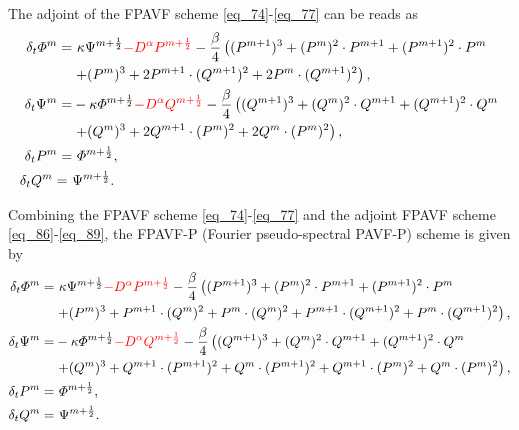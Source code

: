 \documentclass[preprint,compress,3p,10pt,fleqn]{elsarticle}
\numberwithin{equation}{section}
\begin{document}
The adjoint of the FPAVF scheme \eqref{eq_74}-\eqref{eq_77} can be reads as
\begin{align}
\delta_{t} \varPhi^{m}=&~\kappa \Psi^{m+\frac{1}{2}}\textcolor[rgb]{1.00,0.00,0.00}{-D^{\alpha} P^{m+\frac{1}{2}}}-\frac{\beta}{4}\left( (P^{m+1})^3+ (P^{m})^{2}\cdot P^{m+1}+(P^{m+1})^{2}\cdot P^{m}\right.\nonumber\\
	&\left.+ (P^{m})^{3}+2 P^{m+1}\cdot (Q^{m+1})^{2}+2 P^{m}\cdot (Q^{m+1})^{2}\right),\label{eq_86}\\
\delta_{t} \Psi^{m}=&-\kappa \varPhi^{m+\frac{1}{2}}\textcolor[rgb]{1.00,0.00,0.00}{-D^{\alpha} Q^{m+\frac{1}{2}}}-\frac{\beta}{4}\left( (Q^{m+1})^3+ (Q^{m})^{2}\cdot Q^{m+1}+ (Q^{m+1})^{2}\cdot Q^{m}\right.\nonumber\\
	&\left.+ (Q^{m})^{3}+2 Q^{m+1}\cdot (P^{m})^{2}+2 Q^{m}\cdot (P^{m})^{2}\right),\label{eq_87}\\
\delta_{t} P^{m}=&~\varPhi^{m+\frac{1}{2}},\label{eq_88}\\
\delta_{t} Q^{m}=~&\Psi^{m+\frac{1}{2}}.\label{eq_89}
\end{align}

Combining the FPAVF scheme \eqref{eq_74}-\eqref{eq_77} and the adjoint FPAVF scheme \eqref{eq_86}-\eqref{eq_89}, the FPAVF-P (Fourier pseudo-spectral PAVF-P) scheme is given by
\begin{align}
\delta_{t} \varPhi^{m}=&~\kappa \Psi^{m+\frac{1}{2}}\textcolor[rgb]{1.00,0.00,0.00}{-D^{\alpha} P^{m+\frac{1}{2}}}-\frac{\beta}{4}\left((P^{m+1})^3+(P^{m})^{2}\cdot P^{m+1}+(P^{m+1})^{2}\cdot P^{m}\right.\nonumber\\
	&\left.+(P^{m})^{3}+P^{m+1}\cdot (Q^{m})^{2}+P^{m}\cdot (Q^{m})^{2}+P^{m+1}\cdot (Q^{m+1})^{2}+P^{m}\cdot (Q^{m+1})^{2}\right),\label{eq_98}\\
\delta_{t} \Psi^{m}=&-\kappa \varPhi^{m+\frac{1}{2}}\textcolor[rgb]{1.00,0.00,0.00}{-D^{\alpha} Q^{m+\frac{1}{2}}}-\frac{\beta}{4}\left((Q^{m+1})^3+(Q^{m})^{2}\cdot Q^{m+1}+(Q^{m+1})^{2}\cdot Q^{m}\right.\nonumber\\
	&\left.+(Q^{m})^{3}+Q^{m+1}\cdot (P^{m+1})^{2}+Q^{m}\cdot (P^{m+1})^{2}+Q^{m+1}\cdot (P^{m})^{2}+Q^{m}\cdot (P^{m})^{2}\right),\label{eq_99}\\
\delta_{t} P^{m}=&~\varPhi^{m+\frac{1}{2}},\label{eq_100}\\
\delta_{t} Q^{m}=&~\Psi^{m+\frac{1}{2}}.\label{eq_101}
\end{align}
\end{document}
